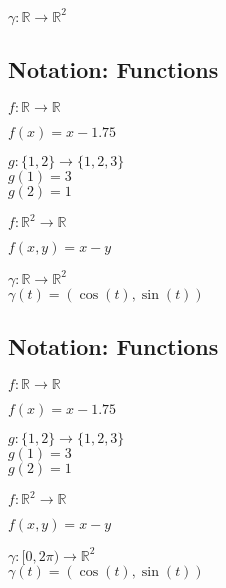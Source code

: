 \documentclass[twocolumn,20pt,fleqn]{extarticle}
\newcommand{\sep}{\vspace{0.5cm}}
\theoremstyle{plain}
\theoremstyle{definition}
\theoremstyle{remark}
\begin{document}
\sep

$\gamma : \mathbb{R} \to \mathbb{R}^2$\\



\clearpage




\subsection{Notation: Functions}

$ f: \mathbb{R}  \to \mathbb{R}$

$f(x) = x - 1.75$\\

\sep

  $g : \{1,2\} \to \{1,2,3\}$\\
    $g(1) = 3$\\
    $g(2) = 1$\\

\sep

$ f: \mathbb{R}^2  \to \mathbb{R}$

$f(  x,y  ) = x - y$


\sep

$\gamma : \mathbb{R} \to \mathbb{R}^2$\\
$\gamma(t) = (\cos(t), \sin(t))$




\clearpage




\subsection{Notation: Functions}

$ f: \mathbb{R}  \to \mathbb{R}$

$f(x) = x - 1.75$\\

\sep

  $g : \{1,2\} \to \{1,2,3\}$\\
    $g(1) = 3$\\
    $g(2) = 1$\\

\sep

$ f: \mathbb{R}^2  \to \mathbb{R}$

$f(  x,y  ) = x - y$


\sep

$\gamma :  [0,2\pi)  \to \mathbb{R}^2$\\
$\gamma(t) = (\cos(t), \sin(t))$
\end{document}
